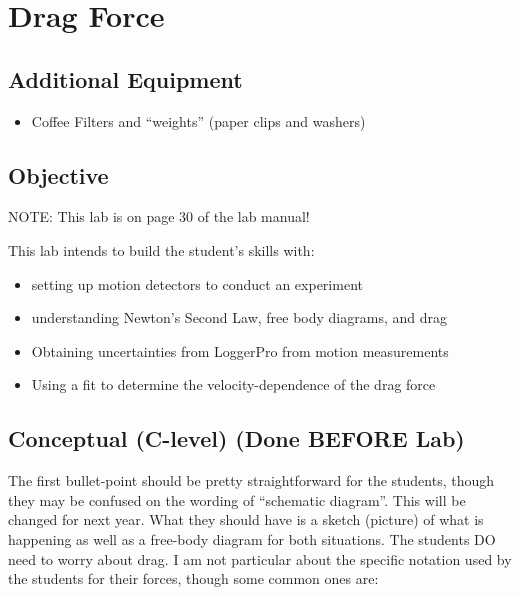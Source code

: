 \documentclass[fleqn,letterpaper]{article}
\begin{document}
\cfoot{}
\headsep=25pt

\section*{Drag Force}

\subsection*{Additional Equipment}

\begin{itemize}
  \item{Coffee Filters and ``weights'' (paper clips and washers)}
\end{itemize}

\subsection*{Objective}

NOTE:  This lab is on page 30 of the lab manual!

This lab intends to build the student's skills with:
%
\begin{itemize}
 \item{setting up motion detectors to conduct an experiment}
 \item{understanding Newton's Second Law, free body diagrams, and drag}
 \item{Obtaining uncertainties from LoggerPro from motion measurements}
 \item{Using a fit to determine the velocity-dependence of the drag force}
\end{itemize}
%

\subsection*{Conceptual (C-level) (Done BEFORE Lab)}

The first bullet-point should be pretty straightforward for the students, though they may be confused on the wording of ``schematic diagram''.  This will be changed for next year.  What they should have is a sketch (picture) of what is happening as well as a free-body diagram for both situations.  The students DO need to worry about drag.  I am not particular about the specific notation used by the students for their forces, though some common ones are:
\end{document}
